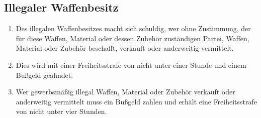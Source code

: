 \documentclass{article}
\begin{document}
\subsection{Illegaler Waffenbesitz}
\begin{enumerate}[(1)]
    \item Des illegalen Waffenbesitzes macht sich schuldig, wer ohne Zustimmung, der für diese Waffen, Material oder dessen Zubehör zuständigen Partei, Waffen, Material oder Zubehör beschafft, verkauft oder anderweitig vermittelt.
    \item Dies wird mit einer Freiheitsstrafe von nicht unter einer Stunde und einem Bußgeld geahndet.
    \item Wer gewerbsmäßig illegal Waffen, Material oder Zubehör verkauft oder anderweitig vermittelt muss ein Bußgeld zahlen und erhält eine Freiheitsstrafe von nicht unter vier Stunden.
\end{enumerate}
\end{document}
